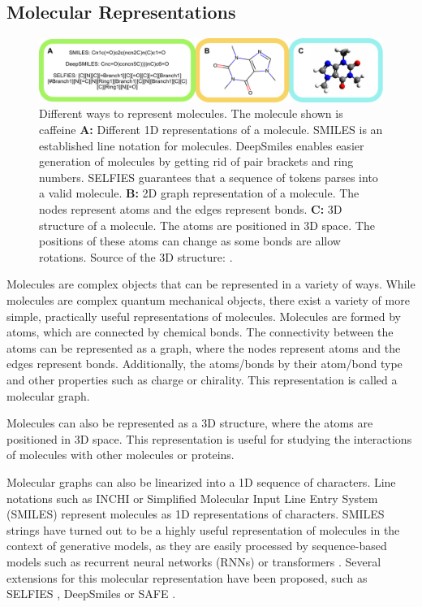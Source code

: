 \subsection{Molecular Representations}
\begin{figure}
    \centering
    \includegraphics[width=\textwidth]{figures/representations/representations.pdf}
    \caption{Different ways to represent molecules. The molecule shown 
    is caffeine \textbf{A:} Different 1D representations of a molecule. SMILES is an established 
    line notation for molecules. DeepSmiles enables easier generation of
    molecules by getting rid of pair brackets and ring numbers. SELFIES
    guarantees that a sequence of tokens parses into a valid molecule.
    \textbf{B:} 2D graph representation of a molecule. The nodes represent
    atoms and the edges represent bonds. 
    \textbf{C:} 3D structure of a molecule. The atoms are positioned in 3D
    space. The positions of these atoms can change as some bonds are 
    allow rotations. Source of the 3D structure: \citep{EnglishCaffeine3D2010}.
    \label{fig:molecular-graph}}
\end{figure}
Molecules are complex objects that can be represented in a variety of ways.
While molecules are complex quantum mechanical objects, there exist 
a variety of more simple, practically useful representations of molecules.
Molecules are formed by atoms, which are connected by chemical bonds.
The connectivity between the atoms can be represented as a graph, where
the nodes represent atoms and the edges represent bonds. Additionally,
the atoms/bonds by their atom/bond type and other properties such as
charge or chirality. This representation is called a molecular graph.

Molecules can also be represented as a 3D structure, where the atoms are
positioned in 3D space. This representation is useful for studying the
interactions of molecules with other molecules or proteins. 

Molecular graphs can also be linearized into a 1D sequence of characters. Line
notations such as INCHI \citep{todo} or Simplified Molecular Input Line Entry
System (SMILES) \citep{weiningerSMILESChemicalLanguage1988} represent molecules
as 1D representations of characters. SMILES strings have turned out to be a
highly useful representation of molecules in the context of generative models,
as they are easily processed by sequence-based models such as recurrent neural
networks (RNNs) or transformers \citep{vaswaniAttentionAllYou2017}. Several
extensions for this molecular representation have been proposed, such as SELFIES
\citep{krennSELFIESFutureMolecular2022}, DeepSmiles
\citep{oboyleDeepSMILESAdaptationSMILES2018} or SAFE
\citep{noutahiGottaBeSAFE2023}. 

